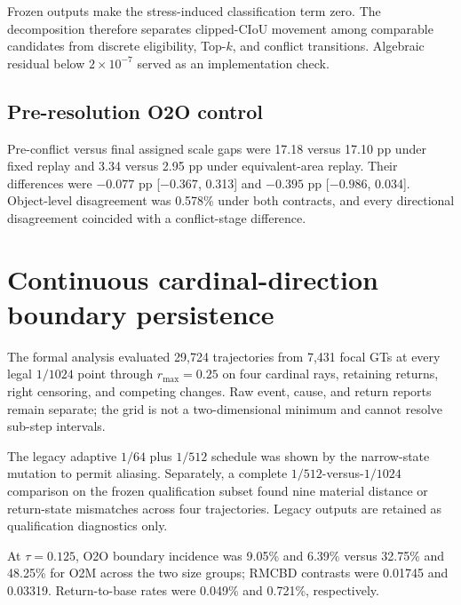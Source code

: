 \documentclass[preprint,10pt]{elsarticle}
\begin{document}
Frozen outputs make the stress-induced classification term zero. The decomposition therefore separates clipped-CIoU movement among comparable candidates from discrete eligibility, Top-$k$, and conflict transitions. Algebraic residual below $2\times10^{-7}$ served as an implementation check.

\subsection{Pre-resolution O2O control}

Pre-conflict versus final assigned scale gaps were 17.18 versus 17.10 pp under fixed replay and 3.34 versus 2.95 pp under equivalent-area replay. Their differences were $-0.077$ pp [$-0.367$, 0.313] and $-0.395$ pp [$-0.986$, 0.034]. Object-level disagreement was 0.578\% under both contracts, and every directional disagreement coincided with a conflict-stage difference.

\section{Continuous cardinal-direction boundary persistence}

The formal analysis evaluated 29,724 trajectories from 7,431 focal GTs at every legal $1/1024$ point through $r_{\max}=0.25$ on four cardinal rays, retaining returns, right censoring, and competing changes. Raw event, cause, and return reports remain separate; the grid is not a two-dimensional minimum and cannot resolve sub-step intervals.

The legacy adaptive $1/64$ plus $1/512$ schedule was shown by the narrow-state mutation to permit aliasing. Separately, a complete $1/512$-versus-$1/1024$ comparison on the frozen qualification subset found nine material distance or return-state mismatches across four trajectories. Legacy outputs are retained as qualification diagnostics only.

\begin{table}[ht]
\centering
\caption{Full-domain $1/1024$ restricted mean cardinal boundary distance (RMCBD) through $\tau=0.125$.}
\label{tab:supp_boundary_rmcbd}

\end{table}

At $\tau=0.125$, O2O boundary incidence was 9.05\% and 6.39\% versus 32.75\% and 48.25\% for O2M across the two size groups; RMCBD contrasts were 0.01745 and 0.03319. Return-to-base rates were 0.049\% and 0.721\%, respectively.
\end{document}

